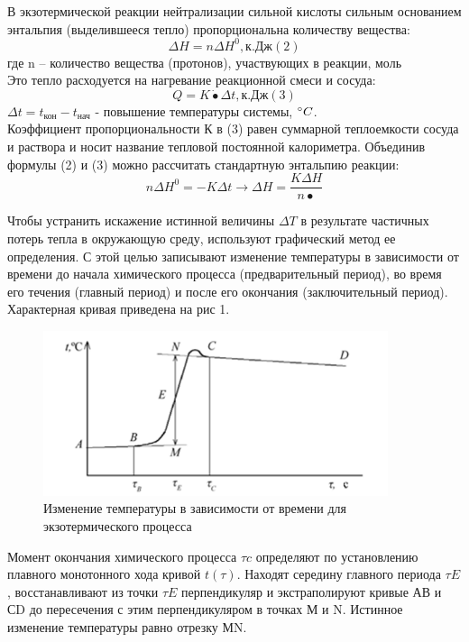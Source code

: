 \documentclass[a4paper, 12pt]{article}%
\begin{document}
\linebreak В экзотермической реакции нейтрализации сильной кислоты сильным основанием энтальпия (выделившееся тепло) пропорциональна количеству вещества:
\[\Delta H = n \Delta H^0, \text{к.Дж}  (2)\]
где n – количество вещества (протонов), участвующих в реакции, моль\\ Это тепло расходуется на нагревание реакционной смеси и сосуда:
\[Q = K\dot{•}\Delta t, \text{к.Дж} (3)\] 
$\Delta t = t_{\text{кон}} - t_{\text{нач}}$ -  повышение температуры системы, $\degree C$. \\
\linebreak Коэффициент пропорциональности К в (3)  равен суммарной теплоемкости сосуда и раствора и носит название тепловой постоянной калориметра. Объединив формулы (2) и (3) можно рассчитать стандартную энтальпию реакции:
\[n\Delta H^0 = -K \Delta t \rightarrow \Delta H = \frac{K \Delta H}{n•}\]

Чтобы устранить искажение истинной величины $\Delta T$ в результате частичных потерь тепла в окружающую среду, используют графический метод ее определения. С этой целью записывают изменение температуры в зависимости от времени до начала химического процесса (предварительный период), во время его течения (главный период) и после его окончания (заключительный период). Характерная кривая приведена на рис 1.
\begin{figure}
\includegraphics[width = 0.9\textwidth]{fig1.png}
\caption{ Изменение температуры в зависимости от времени для экзотермического процесса}
\end{figure}

Момент окончания химического процесса $ \tau c$ определяют по установлению плавного монотонного хода кривой $ t(\tau)$. Находят середину главного периода $\tau E$, восстанавливают из точки $\tau E$ перпендикуляр и экстраполируют кривые АВ и СD до пересечения с этим перпендикуляром в точках М и N. Истинное изменение температуры равно отрезку МN.
\end{document}
